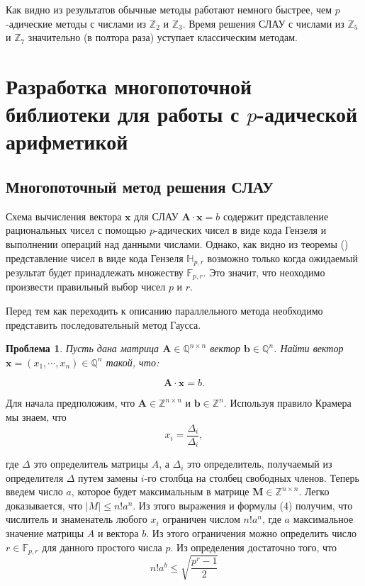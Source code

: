 \documentclass[master, och, diploma, times]{sty/SCWorks}
\theoremstyle{plain}
\newtheorem{problem}{Проблема}[section]
\theoremstyle{definition}
\begin{document}
 Как видно из результатов обычные методы работают немного быстрее, чем $p$-адические методы с числами из $\mathbb{Z}_2$ и $\mathbb{Z}_3$. Время решения СЛАУ с числами из $\mathbb{Z}_5$ и $\mathbb{Z}_7$ значительно (в полтора раза) уступает классическим методам.
 
\section{Разработка многопоточной библиотеки для работы с $p$-адической арифметикой}

\subsection{Многопоточный метод решения СЛАУ}
Схема вычисления вектора $\boldsymbol{x}$ для СЛАУ $\boldsymbol{A}\cdot \boldsymbol{x} = b$ содержит представление рациональных чисел с помощью $p$-адических чисел в виде кода Гензеля и выполнении операций над данными числами. Однако, как видно из теоремы () представление чисел в виде кода Гензеля $\mathbb{H}_{p,r}$ возможно только когда ожидаемый результат будет принадлежать множеству $\mathbb{F}_{p,r}$. Это значит, что неоходимо произвести правильный выбор чисел $p$ и $r$.


Перед тем как переходить к описанию параллельного метода необходимо представить последовательный метод Гаусса.

\begin{problem}
Пусть дана матрица $\boldsymbol{A} \in \mathbb{Q}^{n \times n}$ вектор $\boldsymbol{b} \in \mathbb{Q}^{n}$. Найти вектор $\boldsymbol{x}=(x_1,\cdots,x_n) \in \mathbb{Q}^{n}$ такой, что:

$$
\boldsymbol{A}\cdot \boldsymbol{x} = b.
$$
\end{problem}

Для начала предположим, что $\boldsymbol{A} \in \mathbb{Z}^{n \times n}$ и $\boldsymbol{b} \in \mathbb{Z}^{n}$. Используя правило Крамера мы знаем, что 
$$
x_i=\frac{\Delta_i}{\Delta_i},
$$

\noindent где $\Delta$ это определитель матрицы $A$, а $\Delta_i$ это определитель, получаемый из определителя $\Delta$ путем замены $i$-го столбца на столбец свободных членов. Теперь введем число $a$, которое будет максимальным в матрице $\boldsymbol{M} \in \mathbb{Z}^{n \times n}$. Легко доказывается, что $\mid M \mid \leq n!a^n$. Из этого выражения и формулы (4) получим, что числитель и знаменатель любого $x_i$ ограничен числом $n!a^n$, где $a$ максимальное значение матрицы $A$ и вектора $b$. Из этого ограничения можно определить число $r \in \mathbb{F}_{p,r}$ для данного простого числа $p$. Из определения достаточно того, что
$$
n!a^b \leq \sqrt{\frac{p^r-1}{2}}
$$
\end{document}
